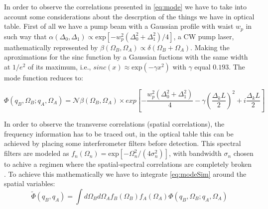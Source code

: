 In order to observe the correlations presented in \ref{eq:mode} we have to take into account some considerations about the descrption of the things we have in optical table.
First of all we have a pump beam with a Gaussian profile with waist $w_p$ 
in such way that $\alpha (\Delta_0,\Delta_1 ) \propto \text{exp}[-w_p^2 (\Delta_0^2 + \Delta_1^2 )/4]$, a CW pump laser, mathematically represented by
$\beta (\Omega_B , \Omega_A) \propto \delta(\Omega_B + \Omega_A)$. Making the aproximations for the sinc function by a Gaussian fuctions with the same width at $1/e^2$ of its maximum,
i.e., $sinc(x) \approx \text{exp}(-\gamma x^2)$ with $\gamma$ equal $0.193$.
The mode function reduces to:

\begin{equation}
\label{eq:modeSim}
\Phi(q_B,\Omega_B;q_A,\Omega_A) = \mathcal{N} \beta (\Omega_B , \Omega_A)
\times \textit{exp}\left[ -\frac{w_p^2 (\Delta_0^2 + \Delta_1^2 )}{4}-\gamma \left(\frac{\Delta_k L}{2} \right)^2 + i\frac{\Delta_k L}{2} \right]  
\end{equation}

In order to observe the transverse correlations (spatial correlations), the 
frequency information has to be traced out, in the optical table this can
be achieved by placing some interferometer filters before detection. This spectral
filters are modeled as $f_n (\Omega_n)=\text{exp}[-\Omega_n^2/(4\sigma_n^2)]$, with bandwidth $\sigma_n$ chosen to achive a regimen where the 
spatial-spectral correlations are completely broken \cite{broke}. 
To achieve this mathematically we have to integrate \ref{eq:modeSim} around the
spatial variables:
\begin{equation}
\label{eq:modeSpa}
\tilde{\Phi}(q_B,q_A) = \int d\Omega_B d\Omega_A f_B(\Omega_B)f_A(\Omega_A) \Phi(q_B,\Omega_B;q_A,\Omega_A)
\end{equation}

